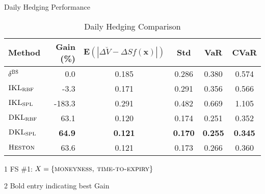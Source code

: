 \documentclass[10pt,table,mathserif]{beamer}
\newcommand{\vx}{\mathbf{x}}
\newcommand{\E}{\mathbf{E}}
\newcommand{\DS}{\Delta S}
\newcommand{\Heston}{\textsc{Heston}}
\newcommand{\DVmkt}{\Delta \breve{V}}
\newcommand{\MeanAbs}{\E(|\DVmkt-\DS f(\vx)|)}
\newcommand{\DKLs}{\bf\textsc{DKL}_{\text{SPL}}}
\newcommand{\DKLg}{\bf\textsc{DKL}_{\text{RBF}}}
\newcommand{\IKLs}{\bf\textsc{IKL}_{\text{SPL}}}
\newcommand{\IKLg}{\bf\textsc{IKL}_{\text{RBF}}}
\newcommand{\Del}{\delta^{\textsc{BS}}}
\begin{document}
\begin{frame}{Daily Hedging Performance}

\begin{table}[htp!]
\small
\begin{center}
\begin{threeparttable}
\begin{tabular}{|l|r c c c c|}
\hline
Method & Gain (\%)& $\MeanAbs$ & Std& VaR & CVaR   \\ \hline
$\Del$ & 0.0 & 0.185 & 0.286 & 0.380 & 0.574 \\
$\IKLg$  & -3.3 & 0.171 & 0.291 & 0.356 & 0.566 \\
$\IKLs$  & -183.3 & 0.291 & 0.482 & 0.669 & 1.105 \\
$\DKLg$  & 63.1 & 0.120 & 0.174 & 0.251 & 0.352 \\
$\DKLs$  & \textbf{64.9} & \textbf{0.121} & \textbf{0.170} & \textbf{0.255} & \textbf{0.345} \\
$\Heston$ & 63.6 & 0.121 & 0.173 & 0.266 & 0.360 \\
\hline
\end{tabular}
\caption{Daily Hedging Comparison}
\label{Daily}
 \begin{tablenotes}
    \small
  \item[1] FS \#1: $X=\{\textsc{moneyness,~time-to-expiry}\}$
  \item[2] Bold entry indicating best Gain
  \end{tablenotes}
  \end{threeparttable}
\end{center}
\end{table}

\end{frame}
\end{document}
